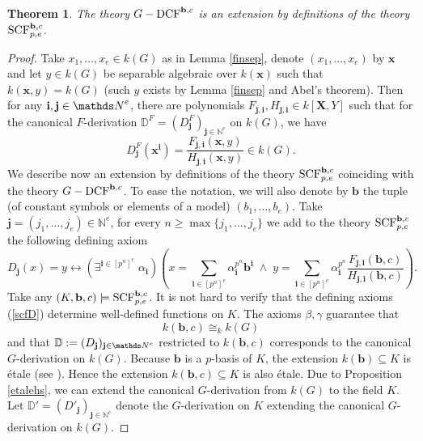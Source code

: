 \documentclass[10pt]{amsart}
\newtheorem{theorem}{Theorem}[section]
\theoremstyle{definition}
\begin{document}
\begin{theorem}\label{biin}
The theory $G-\operatorname{DCF}^{{\mathbf{b}},c}$ is an extension by definitions of the theory $\operatorname{SCF}^{{\mathbf{b}},c}_{p,e}$.
\end{theorem}
\begin{proof}
Take $x_1,\ldots,x_e\in k(G)$ as in Lemma \ref{finsep}, denote $(x_1,\ldots,x_e)$ by $\mathbf{x}$ and let $y\in k(G)$ be separable algebraic over $k(\mathbf{x})$ such that $k(\mathbf{x},y)=k(G)$ (such $y$ exists by Lemma \ref{finsep} and Abel's theorem). Then for any $\mathbf{i},\mathbf{j}\in \Nn^e$, there are polynomials $F_{\mathbf{j},\mathbf{i}},H_{\mathbf{j},\mathbf{i}}\in k[\mathbf{X},Y]$ such that for the canonical $F$-derivation
$\mathbb{D}^{F}=(D_{\mathbf{j}}^F)_{\mathbf{j}\in\mathbb{N}^e}$ on $k(G)$, we have
$$D_{\mathbf{j}}^F(\mathbf{x}^{\mathbf{i}})=\frac{F_{\mathbf{j},\mathbf{i}}(\mathbf{x},y)}{H_{\mathbf{j},\mathbf{i}}(\mathbf{x},y)}\in k(G).$$
We describe now an extension by definitions of the theory $\operatorname{SCF}_{p,e}^{{\mathbf{b}},c}$ coinciding with the theory $G-\operatorname{DCF}^{{\mathbf{b}},c}$. To ease the notation, we will also denote by $\mathbf{b}$ the tuple (of constant symbols or elements of a model) $(b_1,\ldots,b_e)$.
Take $\mathbf{j}=(j_1,\ldots,j_e)\in\mathbb{N}^e$, for every $n\geqslant \max\lbrace j_1,\ldots,j_e\rbrace$
we add to the theory $\operatorname{SCF}_{p,e}^{{\mathbf{b}},c}$ the following defining axiom
\begin{equation}\label{scfD}\tag{$\clubsuit$}
D_{\mathbf{j}}(x)=y \leftrightarrow \left(\exists^{\mathbf{i}\in[p^n]^e}\; \alpha_{\mathbf{i}}\right)
\left(x=\sum\limits_{\mathbf{i}\in[p^n]^e}\alpha_{\mathbf{i}}^{p^n}\mathbf{b}^{\mathbf{i}}
\;\wedge\; y=\sum\limits_{\mathbf{i}\in[p^n]^e}\alpha_{\mathbf{i}}^{p^n}\frac{F_{\mathbf{j},\mathbf{i}}(\mathbf{b},c)}{H_{\mathbf{j},\mathbf{i}}(\mathbf{b},c)} \right).
\end{equation}
Take any $(K,\mathbf{b},c)\models \operatorname{SCF}_{p,e}^{{\mathbf{b}},c}$.  It is not hard to verify that the defining axioms (\ref{scfD}) determine well-defined functions on $K$. The axioms $\beta,\gamma$ guarantee that
 $$k(\mathbf{b},c)\cong_k k(G)$$ 
 and that $\mathbb{D}:=(D_{\mathbf{j}})_{\mathbf{j}\in \Nn^e}$ restricted to $k(\mathbf{b},c)$ corresponds to the canonical $G$-derivation on $k(G)$.
 Because $\mathbf{b}$ is a $p$-basis of $K$, the extension
 $k(\mathbf{b})\subseteq K$ is \'{e}tale
 (see \cite[Theorem 26.8]{mat}). Hence the extension $k(\mathbf{b},c)\subseteq K$ is also \'{e}tale. Due to Proposition \ref{etalehs}, we can extend the canonical $G$-derivation from $k(G)$ to the field $K$. Let $\mathbb{D}'=\left(D'_{\mathbf{j}}\right)_{\mathbf{j}\in\mathbb{N}^e}$
 denote the $G$-derivation on $K$ extending the canonical $G$-derivation on $k(G)$.


\end{proof}
\end{document}
